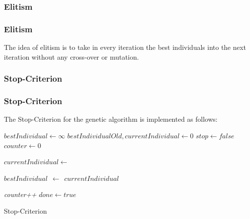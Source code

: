 \documentclass{beamer}
\begin{document}
\begin{frame}

\subsubsection{Elitism}
\frametitle{Elitism}
The idea of elitism is to take in every iteration the best individuals into the next iteration without any cross-over or mutation. 
\end{frame}
\subsubsection{Stop-Criterion}
\begin{frame}
\frametitle{Stop-Criterion}
The Stop-Criterion for the genetic algorithm is implemented as follows:
\IncMargin{1em}
\begin{algorithm}[H]
$bestIndividual \leftarrow \infty $   
$bestIndividualOld,currentIndividual \leftarrow 0$\;
$stop \leftarrow false$\;
$counter \leftarrow 0$\;
 {
	$currentIndividual \leftarrow $\iter{}\;
	 {
	
		$ bestIndividual \ \   \leftarrow \ \ currentIndividual $\;
	
	}
	 {
		\emph{counter++}
	} 
	 {
		$done \leftarrow true$
	}  
	
	
	
	
	}
	 

\caption{Stop-Criterion}
\end{algorithm}\DecMargin{1em}

\end{frame}
\end{document}
